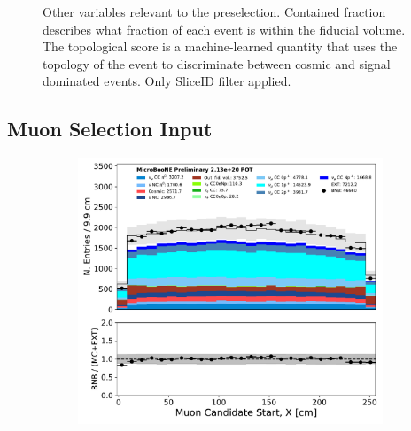 \begin{figure}[H]
\begin{subfigure}[b]{0.3\textwidth}
        \end{subfigure}
    \caption{Other variables relevant to the preselection. Contained fraction describes what fraction of each event is within the fiducial volume. The topological score is a machine-learned quantity that uses the topology of the event to discriminate between cosmic and signal dominated events. Only SliceID filter applied.}
    \label{fig::Appendix::constraint:inputvars:others}
\end{figure}

\subsection{Muon Selection Input}
\label{ssec:Appendix:numu:muonselinput}
\begin{figure}[H]
    \centering
        \begin{subfigure}[b]{0.3\textwidth}
        \centering
        \includegraphics[width=\textwidth]{NuMuCCsel/Images/Ryan/appendix_muonsel_input_R3/trk_sce_start_x_v_07232020_presel_samples_detsys_event_category.pdf}
        \end{subfigure}
        \begin{subfigure}[b]{0.3\textwidth}
        \centering

\end{subfigure}
\end{figure}
